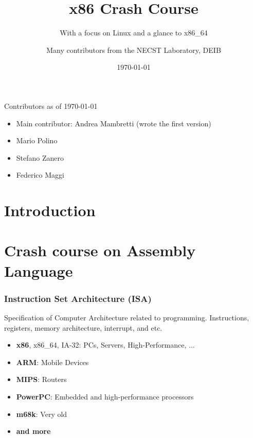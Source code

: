 \documentclass[]{beamer}
\title{x86 Crash Course}
\subtitle{With a focus on Linux and a glance to x86\_64}
\author[NECSTLab]{Many contributors from the NECST Laboratory, DEIB}
\institute{Politecnico di Milano}
\date{\today}
\begin{document}
\begin{frame}
  \titlepage
\end{frame}

\begin{frame}{Contributors as of \today}
  \begin{itemize}
  \item Main contributor: Andrea Mambretti (wrote the first version)
  \item Mario Polino
  \item Stefano Zanero
  \item Federico Maggi
  \end{itemize}
\end{frame}

\section{Introduction}

\begin{frame}
  \tableofcontents
\end{frame}

\section{Crash course on Assembly Language}

\begin{frame}
  \frametitle{Instruction Set Architecture (ISA)}
  Specification of Computer Architecture related to programming. Instructions, registers, memory architecture, interrupt, and etc.
  \begin{itemize}
    \item{{\bf x86}, x86\_64, IA-32: PCs, Servers, High-Performance, ...}
    \item{{\bf ARM}: Mobile Devices}
    \item{{\bf MIPS}: Routers}
    \item{{\bf PowerPC}: Embedded and high-performance processors}
    \item{{\bf m68k}: Very old}
    \item{{\bf and more}}
  \end{itemize}

\end{frame}
\end{document}
